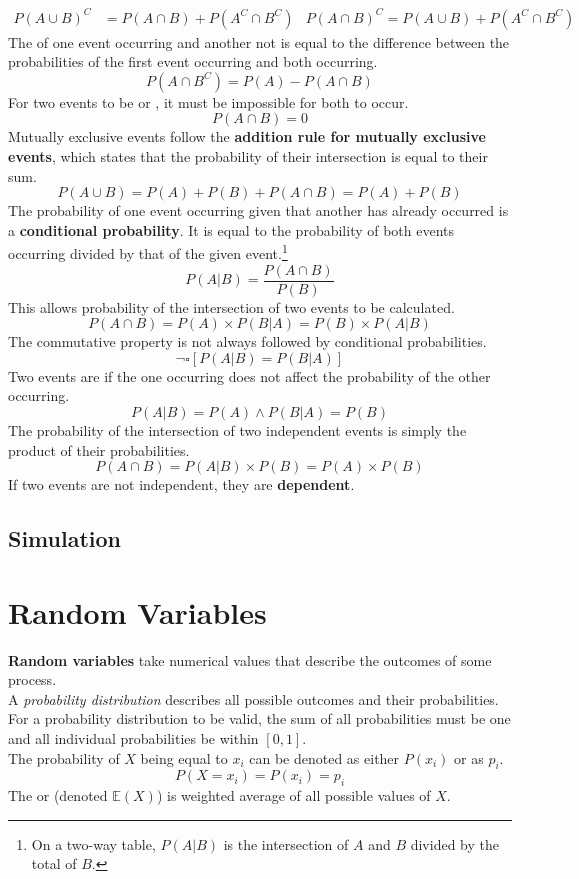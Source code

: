 \documentclass[../AP_Statistics.tex]{subfiles}
\begin{document}
		\begin{align*}
			P(A\cup B)^C &= P(A\cap B) + P\left(A^C\cap B^C\right)	& P(A\cap B)^C = P(A\cup B) + P\left(A^C \cap B^C\right)
			\end{align*}
		The  of one event occurring and another not is equal to the difference between the probabilities of the first event occurring and both occurring.
		\[P\left(A\cap B^C\right) = P(A) - P(A\cap B)\]
		For two events to be  or , it must be impossible for both to occur.
		\[P(A\cap B) = 0\]
		Mutually exclusive events follow the \textbf{addition rule for mutually exclusive events}, which states that the probability of their intersection is equal to their sum.
		\[P(A\cup B) = P(A) + P(B) + P(A\cap B) = P(A) + P(B)\]
		The probability of one event occurring given that another has already occurred is a \textbf{conditional probability}. It is equal to the probability of both events occurring divided by that of the given event.\footnote{On a two-way table, $P(A|B)$ is the intersection of $A$ and $B$ divided by the total of $B$.}
		\[P(A|B) = \frac{P(A\cap B)}{P(B)}\]
		This allows probability of the intersection of two events to be calculated.
		\[P(A\cap B) = P(A) \times P(B|A) = P(B) \times P(A|B)\]
		The commutative property is not always followed by conditional probabilities.
		\[\lnot\square[P(A|B) = P(B|A)]\]
		Two events are  if the one occurring does not affect the probability of the other occurring.
		\[P(A|B) = P(A) \land P(B|A) = P(B)\]
		The probability of the intersection of two independent events is simply the product of their probabilities.
		\[P(A\cap B) = P(A|B) \times P(B) = P(A) \times P(B)\]
		If two events are not independent, they are \textbf{dependent}.
		\section*{Simulation}
	\chapter{Random Variables}
		\textbf{Random variables} take numerical values that describe the outcomes of some  process. \\
		A \emph{probability distribution} describes all possible outcomes and their probabilities. \\
		For a probability distribution to be valid, the sum of all probabilities must be one and all individual probabilities be within $[0,1]$. \\
		The probability of $X$ being equal to $x_i$ can be denoted as either $P(x_i)$ or as $p_i$.
		\[P(X = x_i) = P(x_i) = p_i\]
		The  or  (denoted $\mathbb{E}(X)$) is weighted average of all possible values of $X$.
\end{document}

